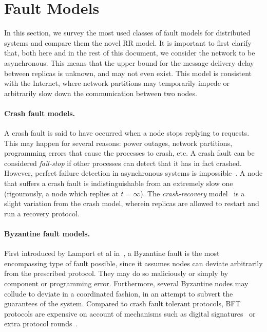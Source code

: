 \label{chap:related}
\cleardoublepage{}

\section{Fault Models}\label{sec:related_fault_models}

In this section, we survey the most used classes of fault models
for distributed systems and compare them the novel
\ac{RR} model. It is important to first clarify that, both
here and in the rest of this document, we consider the network to
be asynchronous. This means that the upper bound for the message
delivery delay between replicas is unknown, and may not even
exist. This model is consistent with the Internet, where network
partitions may temporarily impede or arbitrarily slow down the
communication between two nodes.

\paragraph{Crash fault models.} A crash fault is said to have
occurred when a node stops replying to requests. This may happen
for several reasons: power outages, network
partitions, programming errors that
cause the processes to crash, etc. A crash fault can be
considered \emph{fail-stop} if other processes can detect that it
has in fact crashed. However, perfect failure detection in asynchronous
systems is impossible~\cite{perfect-failure-impossible}. A node that
suffers a crash fault is indistinguishable from an extremely slow
one~\cite{polynomial-communication} (rigourously, a node which replies at $t = \infty$).  The
\emph{crash-recovery}
model~\cite{consensus-recovery,crash-recovery} is a slight variation from the crash
model, wherein replicas are allowed to restart and run a recovery
protocol.

\paragraph{Byzantine fault models.}
First introduced by Lamport et al in~\cite{lamport:byzgenerals},
a Byzantine fault is the most encompassing type of fault
possible, since it assumes nodes can deviate arbitrarily from the
prescribed protocol. They may do so maliciously or simply by component
or programming error. Furthermore, several Byzantine nodes may
collude to deviate in a coordinated fashion, in an attempt to
subvert the guarantees of the system. Compared to crash fault
tolerant protocols, \ac{BFT} protocols are expensive on account of
mechanisms such as digital signatures~\cite{bqs} or extra protocol
rounds~\cite{pbft}.

